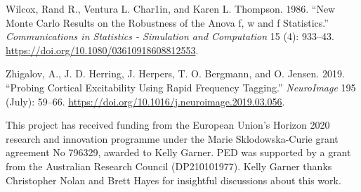 \documentclass[11pt,halfline,a4paper,]{ouparticle}
\newlength{\cslhangindent}
\newlength{\cslentryspacingunit} %
\newenvironment{CSLReferences}[2] %
 {%
  \setlength{\parindent}{0pt}
  \ifodd #1
  \let\oldpar\par
  \def\par{\hangindent=\cslhangindent\oldpar}
  \fi
  \setlength{\parskip}{#2\cslentryspacingunit}
 }%
 {}
\begin{document}
\begin{CSLReferences}{1}{0}
\leavevmode{}%
Wilcox, Rand R., Ventura L. Char1in, and Karen L. Thompson. 1986. {``New Monte Carlo Results on the Robustness of the Anova f, w and f Statistics.''} \emph{Communications in Statistics - Simulation and Computation} 15 (4): 933--43. \url{https://doi.org/10.1080/03610918608812553}.

\leavevmode{}%
Zhigalov, A., J. D. Herring, J. Herpers, T. O. Bergmann, and O. Jensen. 2019. {``Probing Cortical Excitability Using Rapid Frequency Tagging.''} \emph{NeuroImage} 195 (July): 59--66. \url{https://doi.org/10.1016/j.neuroimage.2019.03.056}.

\end{CSLReferences}


\begin{notes}[Acknowledgements]
This project has received funding from the European Union's Horizon 2020 research and innovation programme under the Marie Sklodowska-Curie grant agreement No 796329, awarded to Kelly Garner. PED was supported by a grant from the Australian Research Council (DP210101977). Kelly Garner thanks Christopher Nolan and Brett Hayes for insightful discussions about this work.
\end{notes}
\end{document}
